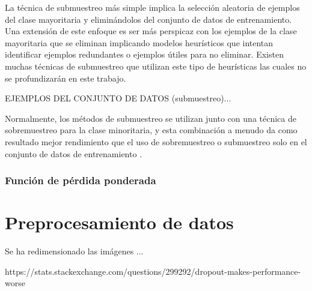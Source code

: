 La técnica de submuestreo más simple implica la selección aleatoria de ejemplos del clase mayoritaria y eliminándolos del conjunto de datos de entrenamiento. Una extensión de este enfoque es ser más perspicaz con los ejemplos de la clase mayoritaria que se eliminan implicando modelos heurísticos que intentan identificar ejemplos redundantes o ejemplos útiles para no eliminar. Existen muchas técnicas de submuestreo que utilizan este tipo de heurísticas las cuales no se profundizarán en este trabajo.

EJEMPLOS DEL CONJUNTO DE DATOS (submuestreo)...

Normalmente, los métodos de submuestreo se utilizan junto con una técnica de sobremuestreo para la clase minoritaria, y esta combinación a menudo da como resultado mejor rendimiento que el uso de sobremuestreo o submuestreo solo en el conjunto de datos de entrenamiento \cite{imbalanced-classification}.

\subsubsection{Función de pérdida ponderada}

\section{Preprocesamiento de datos}

Se ha redimensionado las imágenes ...

https://stats.stackexchange.com/questions/299292/dropout-makes-performance-worse 
